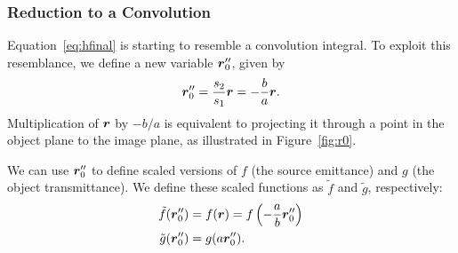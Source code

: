 \documentclass[mphy386-notes.tex]{subfiles}
\begin{document}
\subsubsection{Reduction to a Convolution}

Equation~\ref{eq:hfinal} is starting to resemble a convolution integral. To exploit this
resemblance, we define a new variable $\boldsymbol{r}_0''$, given by
\begin{align}
  \boldsymbol{r}_0'' = \frac{s_2}{s_1}\boldsymbol{r} = -\frac{b}{a}\boldsymbol{r}.
\end{align}
Multiplication of $\boldsymbol{r}$ by $-b/a$ is equivalent to projecting it through a
point in the object plane to the image plane, as illustrated in Figure~\ref{fig:r0}.


We can use $\boldsymbol{r}_0''$ to define scaled versions of $f$ (the source emittance)
and $g$ (the object transmittance).  We define these scaled functions as
$\tilde{f}$ and $\tilde{g}$, respectively:
\begin{align}
  \tilde{f}(\boldsymbol{r}_0'') &= f(\boldsymbol{r}) = f\left(-\frac{a}{b}\boldsymbol{r}_0''\right)\\
  \tilde{g}(\boldsymbol{r}_0'') &= g(a\boldsymbol{r}_0'').
\end{align}
\end{document}
